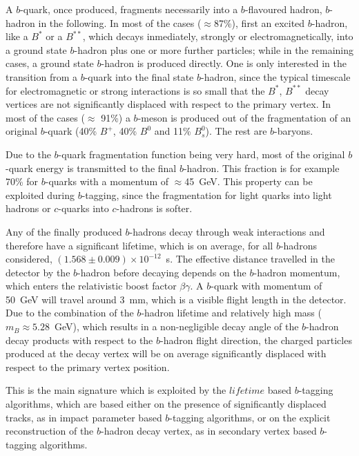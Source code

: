 A $b$-quark, once produced, fragments necessarily into a $b$-flavoured hadron, $b$-hadron in the following. In most of the cases ($\approx$87\%), first an excited $b$-hadron, like a $B^{*}$ or a $B^{**}$, which decays inmediately, strongly or electromagnetically, into a ground state $b$-hadron plus one or more further particles; while in the remaining cases, a ground state $b$-hadron is produced directly.  One is only interested in the transition from a $b$-quark into the final state $b$-hadron, since the typical timescale for electromagnetic or strong interactions is so small that the  $B^{*}$, $B^{**}$ decay vertices are not significantly displaced with respect to the primary vertex.   In most of the cases ($\approx$ 91\%) a $b$-meson is produced out of the fragmentation of an original $b$-quark (40\% $B^+$, 40\% $B^0$ and 11\% $B^0_s$). The rest are $b$-baryons.

Due to the $b$-quark fragmentation function being very hard, most of the original $b$-quark energy is transmitted to the final $b$-hadron. This fraction is for example 70\% for $b$-quarks with a momentum of $\approx$45~GeV. This property can be exploited during $b$-tagging, since the fragmentation for light quarks into light hadrons or $c$-quarks into $c$-hadrons is softer.

Any of the finally produced $b$-hadrons decay through weak interactions and therefore have a significant lifetime, which is on average, for all $b$-hadrons considered, $(1.568\pm0.009) \times 10^{-12}$~s.  The effective distance travelled in the detector by the $b$-hadron before decaying depends on the $b$-hadron momentum, which enters the relativistic boost factor $\beta\gamma$. A $b$-quark with momentum of 50~GeV will travel around 3~mm, which is a visible flight length in the detector. Due to the combination of the $b$-hadron lifetime and relatively high mass ($m_B \approx 5.28$~GeV), which results in a non-negligible decay angle of the $b$-hadron decay products %
with respect to the $b$-hadron flight direction, the charged particles produced at the decay vertex will be on average significantly displaced with respect to the primary vertex position.

This is the main signature which is exploited by the $lifetime$ based $b$-tagging algorithms, which are based either on the presence of significantly displaced tracks, as in impact parameter based $b$-tagging algorithms, or on the explicit reconstruction of the $b$-hadron decay vertex, as in secondary vertex based $b$-tagging algorithms.


